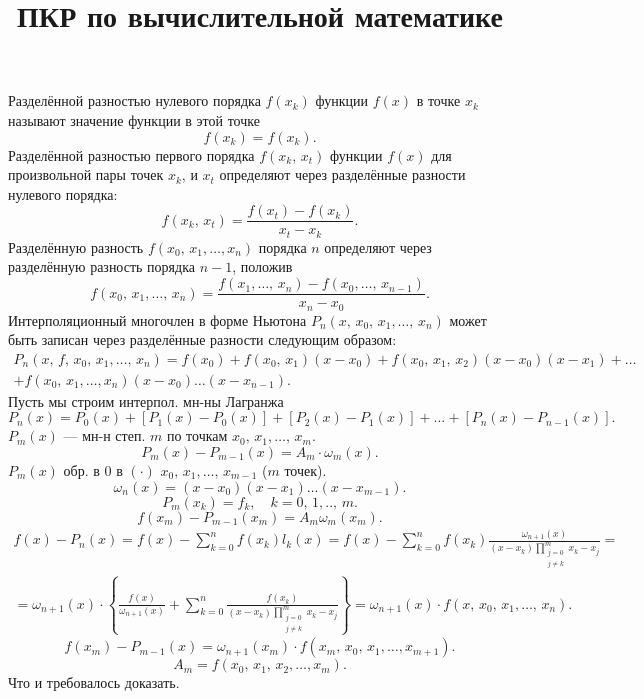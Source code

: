 \documentclass[a4paper]{article}
\title{ПКР по вычислительной математике}
\begin{document}
	\maketitle
	Разделённой разностью нулевого порядка $f(x_k)$
	функции $f(x)$ в точке $x_k$ называют значение
	функции в этой точке
	\[
		f(x_k)=f(x_k)
	.\] 
	Разделённой разностью первого порядка $f(x_k,\, x_t)$ 
	функции $f(x)$ для произвольной пары точек $x_k$, и
	$x_t$ определяют через разделённые разности
	нулевого порядка:
	\[
		f(x_k,\,x_t)= \frac{f(x_t)-f(x_k)}{x_t-x_k}
	.\] 
	Разделённую разность $f(x_0,\,x_1,\ldots,x_{n})$ 
порядка $n$ определяют через разделённую разность порядка 
 $n-1$, положив
 \[
	 f(x_0,\,x_1,\ldots,\,x_n)=
	 \frac{f(x_1,\ldots,\,x_n)-f(x_0,\ldots,\,x_{n-1})}{x_n-x_0}
 .\] 
 Интерполяционный многочлен в форме Ньютона $P_n(x,\,x_0,\,x_1,
 \ldots,\,x_n)$ может быть записан через разделённые разности
 следующим образом:
 \begin{multline*}
	 P_n(x,\,f,\,x_0,\,x_1,\ldots,\,x_n)=
	 f(x_0)+f(x_0,\,x_1)(x-x_0)+f(x_0,\,x_1,\,x_2)(x-x_0)
	 (x-x_1)+\ldots\\+ f(x_0,\,x_1,\ldots,x_n)(x-x_0)\ldots
	 (x-x_{n-1})
 .\end{multline*} 
 Пусть мы строим интерпол. мн-ны Лагранжа
\[
	P_n(x)=P_0(x)+\left[ P_1(x)-P_0(x) \right] +
	\left[ P_2(x)-P_1(x) \right] +\ldots
	+\left[ P_n(x)-P_{n-1}(x) \right] 
.\] 
$P_m(x)$ --- мн-н степ. $m$ по точкам $x_0,\,x_1,\ldots,\,x_m$.
\[
	P_m(x)-P_{m-1}(x)= A_m \cdot \omega_m(x)
.\]
$P_m(x)$ обр. в 0 в $(\cdot)$ $x_0,\,x_1,\ldots,\,x_{m-1}$ ($m$ точек).
\[
	\omega_n(x)= (x-x_0)(x-x_1)\ldots(x-x_{m-1})
.\]
\[
	P_m(x_k)=f_k,\quad k=0,\,1,..,\,m
.\] 
\[
	f(x_m)-P_{m-1}(x_m)=A_m \omega_m (x_m)
.\] 
\begin{multline*}
	f(x)-P_n(x)=f(x)- \sum_{k=0}^{n} f(x_k) l_k(x)=
	f(x)- \sum_{k=0}^{n} f(x_k) \frac{\omega_{n+1}(x)}{(x-x_k) \prod_{\substack{j=0 \\ j\neq k}}^{m}  x_k-x_j }=\\=
	\omega_{n+1}(x) \cdot
	\left\{ \frac{f(x)}{\omega_{n+1}(x)}+
	\sum_{k=0}^{n}\frac{f(x_k)}{(x-x_k) \prod_{\substack{j=0 \\ j\neq k}}^{m}  x_k-x_j} \right\} =
	\omega_{n+1}(x)\cdot f(x,\,x_0,\,x_1,\ldots,\,x_n)
.\end{multline*} 
\[
	f(x_m)-P_{m-1}(x)= \omega_{n+1}(x_m)\cdot f(x_m,\,x_0,\,x_1,\ldots,x_{m+1})
.\] 
\[
	A_m=f(x_0,\,x_1,\,x_2,\ldots,x_m)
.\] 
Что и требовалось доказать.
\end{document}
